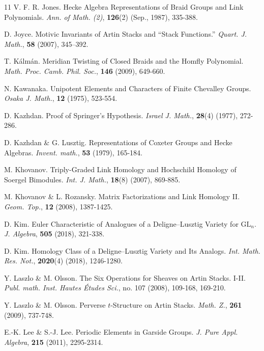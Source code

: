 \documentclass[a4paper,10pt,leqno]{amsart}
\theoremstyle{plain}
\theoremstyle{plain}
\theoremstyle{plain}
\theoremstyle{definition}
\theoremstyle{remark}
\begin{document}
\begin{thebibliography}{11}
	V. F. R. Jones.
	Hecke Algebra Representations of Braid Groups and Link Polynomials.
	\textsl{Ann. of Math. (2)},
	\textbf{126}(2)
	(Sep., 1987),
	335-388.

	D. Joyce.
	Motivic Invariants of Artin Stacks and ``Stack Functions.''
	\textsl{Quart. J. Math.},
	\textbf{58}
	(2007),	
	345–392.

	T. K\'alm\'an.
	Meridian Twisting of Closed Braids and the Homfly Polynomial.
	\textsl{Math. Proc. Camb. Phil. Soc.},
	\textbf{146}
	(2009),
	649-660.
	
	N. Kawanaka.
	Unipotent Elements and Characters of Finite Chevalley Groups.
	\textsl{Osaka J. Math.},
	\textbf{12}
	(1975),
	523-554.

	D. Kazhdan.
	Proof of Springer's Hypothesis.
	\textsl{Israel J. Math.},
		\textbf{28}(4)
	(1977),
	272-286.
	
	D. Kazhdan \& G. Lusztig.
	Representations of Coxeter Groups and Hecke Algebras.
	\textsl{Invent. math.},
	\textbf{53}
	(1979),
	165-184.

	M. Khovanov.
	Triply-Graded Link Homology and Hochschild Homology of Soergel Bimodules.
	\textsl{Int. J. Math.},
	\textbf{18}(8)
	(2007),
	869-885.

	M. Khovanov \& L. Rozansky.
	Matrix Factorizations and Link Homology II.
	\textsl{Geom. Top.},
	\textbf{12}
	(2008),
	1387-1425.

	D. Kim.
	Euler Characteristic of Analogues of a Deligne--Lusztig Variety for $\mathrm{GL}_n$.
	\textsl{J. Algebra},
	\textbf{505}
	(2018),
	321-338.
	
	D. Kim.	
	Homology Class of a Deligne--Lusztig Variety and Its Analogs.
	\textsl{Int. Math. Res. Not.},
	\textbf{2020}(4)
	(2018),
	1246-1280.

	Y. Laszlo \& M. Olsson.
	The Six Operations for Sheaves on Artin Stacks. I-II.
	\textsl{Publ. math. Inst. Hautes \'Etudes Sci.},
	no. 107
	(2008),
	109-168, 169-210.

	Y. Laszlo \& M. Olsson.
	Perverse $t$-Structure on Artin Stacks.
	\textsl{Math. Z.},
	\textbf{261}
	(2009),
	737-748.
	
	E.-K. Lee \& S.-J. Lee.
	Periodic Elements in Garside Groups.
	\textsl{J. Pure Appl. Algebra},
	\textbf{215}
	(2011),
	2295-2314.


\end{thebibliography}
\end{document}
